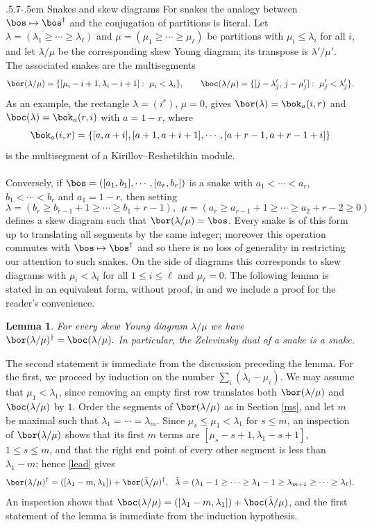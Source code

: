 \documentclass[11pt,reqno]{amsart}
\makeatletter
\newtheorem*{lem}{Lemma}
\theoremstyle{definition} \newtheorem*{defn}{Definition}
\theoremstyle{definition}
\newenvironment{pf}{\proof}{\endproof}
\numberwithin{equation}{section}
\def\subsection{\def\@secnumfont{\bfseries}\@startsection{subsection}{2}%
  {\parindent}{.5\linespacing\@plus.7\linespacing}{-.5em}%
  {\normalfont\bfseries}}
\makeatother
\begin{document}
\subsection{Snakes and skew diagrams}\label{skew} For snakes the analogy between $\bos\mapsto\bos^\dagger$ and the conjugation of
partitions is literal. Let $\lambda=(\lambda_1\ge\cdots\ge\lambda_\ell)$ and $\mu=(\mu_1\ge\cdots\ge\mu_\ell)$ be partitions with $\mu_i\le\lambda_i$ for all $i$,
and let $\lambda/\mu$ be the corresponding skew Young diagram; its transpose is $\lambda'/\mu'$. The associated snakes are the multisegments
$$\bor(\lambda/\mu)=\{[\mu_i-i+1,\lambda_i-i+1]:\ \mu_i<\lambda_i\},\qquad \boc(\lambda/\mu)=\{[j-\lambda'_j,\,j-\mu'_j]:\ \mu'_j<\lambda'_j\}.$$ As an example, the rectangle $\lambda=(i^r)$, $\mu=0$, gives $\bor(\lambda)=\bok_a(i,r)$ and $\boc(\lambda)=\bok_a(r,i)$ with $a=1-r$, where
$$\bok_a(i,r)=\{[a,a+i],[a+1,a+i+1],\cdots,[a+r-1,a+r-1+i]\}$$
is the multisegment of a Kirillov--Reshetikhin module.\\\\
Conversely, if $\bos=([a_1,b_1],\cdots,[a_r,b_r])$ is a snake with $a_1<\cdots<a_r$, $b_1<\cdots<b_r$ and $a_1=1-r$, then setting
$$\lambda=(b_r\ge b_{r-1}+1\ge \cdots\ge b_1+r-1),\ \ \mu=(a_r\ge a_{r-1}+1\ge\cdots\ge  a_2+r-2\ge 0)$$ defines a skew diagram  such that $\bor(\lambda/\mu)=\bos$.
Every snake is of this form up to translating all segments by the same integer; moreover this operation commutes with $\bos\mapsto\bos^\dagger$ and so there is no loss of generality in restricting our attention to such snakes. On the side of diagrams this corresponds to skew diagrams  with $\mu_i<\lambda_i$ for all $1\le i\le \ell$ and  $\mu_\ell=0$. The following lemma is stated in an equivalent form, without proof, in \cite[\S3.2]{LM14} and we include a proof for the reader's convenience.
\begin{lem}\label{skewdual} For every skew Young diagram $\lambda/\mu$ we have
$\bor(\lambda/\mu)^\dagger=\boc(\lambda/\mu).$
In particular, the Zelevinsky dual of a snake is a snake.
\end{lem}
\begin{pf} The second statement is immediate from the discussion preceding the lemma. For the first,  we proceed by induction on the number $\sum_i(\lambda_i-\mu_i)$. We may assume that $\mu_1<\lambda_1$, since
removing an empty first row translates both $\bor(\lambda/\mu)$ and $\boc(\lambda/\mu)$ by $1$. Order the segments of $\bor(\lambda/\mu)$ as in
Section \ref{ms}, and let $m$ be maximal such that $\lambda_1=\cdots=\lambda_m$. Since $\mu_s\le\mu_1<\lambda_1$ for $s\le m$, an inspection of
$\bor(\lambda/\mu)$ shows that its first $m$ terms are $[\mu_s-s+1,\lambda_1-s+1]$, $1\le s\le m$, and that the right end point of every other
segment is less than $\lambda_1-m$; hence \eqref{lead} gives
$$\bor(\lambda/\mu)^\dagger=([\lambda_1-m,\lambda_1])+\bor(\tilde\lambda/\mu)^\dagger,\ \ \tilde\lambda=(\lambda_1-1\ge\cdots\ge\lambda_1-1\ge\lambda_{m+1}\ge\cdots\ge\lambda_\ell).$$
An inspection shows that $\boc(\lambda/\mu)=([\lambda_1-m,\lambda_1])+\boc(\tilde\lambda/\mu)$, and the first statement of the lemma is immediate
from the induction hypothesis. 
\end{pf}
\end{document}
